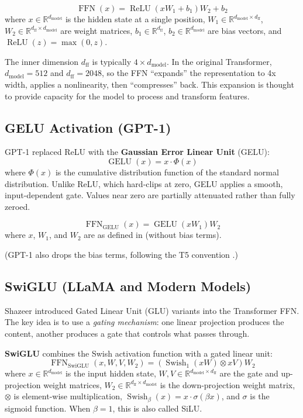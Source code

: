 \documentclass[11pt,a4paper]{article}
\newcommand{\R}{\mathbb{R}}
\newcommand{\ReLU}{\operatorname{ReLU}}
\newcommand{\GELU}{\operatorname{GELU}}
\newcommand{\Swish}{\operatorname{Swish}}
\newcommand{\SwiGLU}{\operatorname{SwiGLU}}
\newcommand{\FFN}{\operatorname{FFN}}
\newcommand{\dmodel}{d_{\text{model}}}
\newcommand{\dff}{d_{\text{ff}}}
\begin{document}
\begin{equation}
  \FFN(x) = \ReLU(x W_1 + b_1) W_2 + b_2
  \label{eq:ffn-relu}
\end{equation}
where $x \in \R^{\dmodel}$ is the hidden state at a single position,
$W_1 \in \R^{\dmodel \times \dff}$, $W_2 \in \R^{\dff \times \dmodel}$ are weight matrices,
$b_1 \in \R^{\dff}$, $b_2 \in \R^{\dmodel}$ are bias vectors, and
$\ReLU(z) = \max(0, z)$.

The inner dimension $\dff$ is typically $4 \times \dmodel$. In the original Transformer,
$\dmodel = 512$ and $\dff = 2048$, so the FFN ``expands'' the representation to 4x width,
applies a nonlinearity, then ``compresses'' back. This expansion is thought to provide
capacity for the model to process and transform features.

\subsection{GELU Activation (GPT-1)}

GPT-1 \cite{radford2018} replaced ReLU with the \textbf{Gaussian Error Linear Unit}
(GELU):
\begin{equation}
  \GELU(x) = x \cdot \Phi(x)
\end{equation}
where $\Phi(x)$ is the cumulative distribution function of the standard normal
distribution. Unlike ReLU, which hard-clips at zero, GELU applies a smooth,
input-dependent gate. Values near zero are partially attenuated rather than fully zeroed.

\begin{equation}
  \FFN_{\text{GELU}}(x) = \GELU(x W_1) W_2
  \label{eq:ffn-gelu}
\end{equation}
where $x$, $W_1$, and $W_2$ are as defined in  (without bias terms).

(GPT-1 also drops the bias terms, following the T5 convention \cite{shazeer2020}.)

\subsection{SwiGLU (LLaMA and Modern Models)}

Shazeer \cite{shazeer2020} introduced Gated Linear Unit (GLU) variants into the
Transformer FFN. The key idea is to use a \emph{gating mechanism}: one linear projection
produces the content, another produces a gate that controls what passes through.

\textbf{SwiGLU} combines the Swish activation function with a gated linear unit:
\begin{equation}
  \FFN_{\SwiGLU}(x, W, V, W_2) = \left(\Swish_1(xW) \otimes xV \right) W_2
  \label{eq:ffn-swiglu}
\end{equation}
where $x \in \R^{\dmodel}$ is the input hidden state,
$W, V \in \R^{\dmodel \times \dff}$ are the gate and up-projection weight matrices,
$W_2 \in \R^{\dff \times \dmodel}$ is the down-projection weight matrix,
$\otimes$ is element-wise multiplication, $\Swish_\beta(x) = x \cdot \sigma(\beta x)$,
and $\sigma$ is the sigmoid function. When $\beta = 1$, this is also called SiLU.
\end{document}
